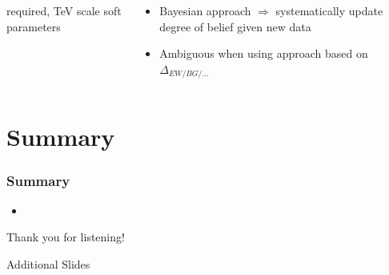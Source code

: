 \documentclass[10pt,aspectratio=169]{beamer}
\begin{document}
\begin{frame}
\begin{columns}[t]
\begin{column}{0.5\textwidth}
\begin{itemize}
        required, TeV scale soft parameters
      \end{itemize}
    \end{column}
    \begin{column}{0.5\textwidth}
      \begin{itemize} \itemsep0.7em
      \item {\color{blue} Bayesian approach $\Rightarrow$
        systematically update degree of belief given new data}
      \item \alert{Ambiguous when using approach based on
        $\Delta_{EW/BG/\ldots}$}
      \end{itemize}
    \end{column}
  \end{columns}
\end{frame}

\section{Summary}

\begin{frame}
  \frametitle{Summary}
  \begin{itemize} \itemsep1em
    \item 
  \end{itemize}
  \begin{center}
    \large Thank you for listening!
  \end{center}
\end{frame}

\appendix

\begin{frame}
  \begin{center}
    {
      \Large
      Additional Slides
    }
  \end{center}
\end{frame}
\end{document}
